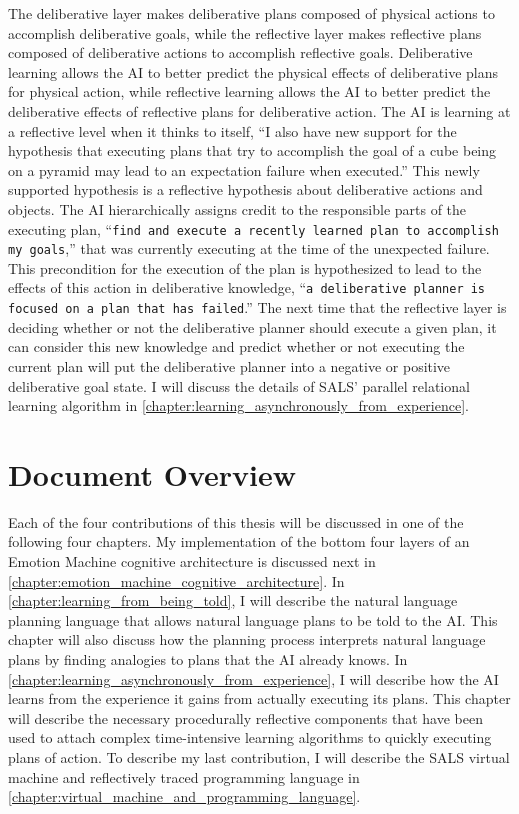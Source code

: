 The deliberative layer makes deliberative plans composed of physical
actions to accomplish deliberative goals, while the reflective layer
makes reflective plans composed of deliberative actions to accomplish
reflective goals.  Deliberative learning allows the AI to better
predict the physical effects of deliberative plans for physical
action, while reflective learning allows the AI to better predict the
deliberative effects of reflective plans for deliberative action.  The
AI is learning at a reflective level when it thinks to itself, ``I
also have new support for the hypothesis that executing plans that try
to accomplish the goal of a cube being on a pyramid may lead to an
expectation failure when executed.''  This newly supported hypothesis
is a reflective hypothesis about deliberative actions and objects.
The AI hierarchically assigns credit to the responsible parts of the
executing plan, ``{\tt{find and execute a recently learned plan to
    accomplish my goals}},'' that was currently executing at the time
of the unexpected failure.  This precondition for the execution of the
plan is hypothesized to lead to the effects of this action in
deliberative knowledge, ``{\tt{a deliberative planner is focused on a
    plan that has failed}}.''  The next time that the reflective layer
is deciding whether or not the deliberative planner should execute a
given plan, it can consider this new knowledge and predict whether or
not executing the current plan will put the deliberative planner into
a negative or positive deliberative goal state.  I will discuss the
details of SALS' parallel relational learning algorithm in
{\mbox{\autoref{chapter:learning_asynchronously_from_experience}}}.

\section{Document Overview}

Each of the four contributions of this thesis will be discussed in one
of the following four chapters.  My implementation of the bottom four
layers of an Emotion Machine cognitive architecture is discussed next
in {\mbox{\autoref{chapter:emotion_machine_cognitive_architecture}}}.
In {\mbox{\autoref{chapter:learning_from_being_told}}}, I will
describe the natural language planning language that allows natural
language plans to be told to the AI.  This chapter will also discuss
how the planning process interprets natural language plans by finding
analogies to plans that the AI already knows.  In
{\mbox{\autoref{chapter:learning_asynchronously_from_experience}}}, I
will describe how the AI learns from the experience it gains from
actually executing its plans.  This chapter will describe the
necessary procedurally reflective components that have been used to
attach complex time-intensive learning algorithms to quickly executing
plans of action.  To describe my last contribution, I will describe
the SALS virtual machine and reflectively traced programming language
in
{\mbox{\autoref{chapter:virtual_machine_and_programming_language}}}.

